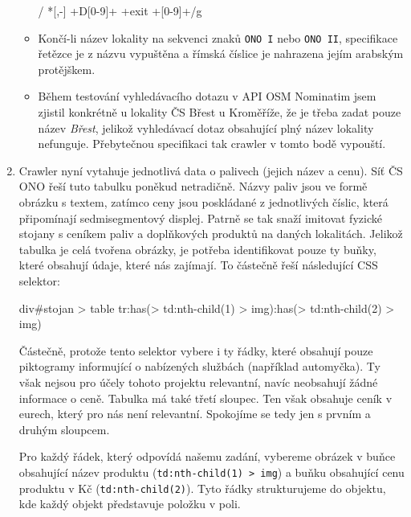 \begin{enumerate}
\begin{itemize}
                \begin{tt}
                    \centering
                    / *[,-] +D[0-9]+ +exit +[0-9]+/g
                \end{tt}
            \item Končí-li název lokality na sekvenci znaků \texttt{ONO I}
                nebo \texttt{ONO II}, specifikace řetězce je z názvu vypuštěna a římská
                číslice je nahrazena jejím arabským protějškem.
            \item Během testování vyhledávacího dotazu v API OSM Nominatim jsem zjistil
                konkrétně u lokality ČS Břest u Kroměříže, že je třeba zadat pouze název
                \emph{Břest}, jelikož vyhledávací dotaz obsahující plný název lokality
                nefunguje. Přebytečnou specifikaci tak crawler v tomto bodě vypouští.
        \end{itemize}
    \item Crawler nyní vytahuje jednotlivá data o palivech (jejich název a cenu).
        Síť ČS ONO řeší tuto tabulku poněkud netradičně. Názvy paliv jsou ve formě
        obrázku s textem, zatímco ceny jsou poskládané z jednotlivých číslic, která
        připomínají sedmisegmentový displej. Patrně se tak snaží imitovat fyzické stojany
        s ceníkem paliv a doplňkových produktů na daných lokalitách. Jelikož tabulka
        je celá tvořena obrázky, je potřeba identifikovat pouze ty buňky, které obsahují
        údaje, které nás zajímají. To částečně řeší následující CSS selektor:

        \begin{tt}
            \centering
            div\#stojan > table tr:has(> td:nth-child(1) > img):has(> td:nth-child(2) > img)
        \end{tt}

        Částečně, protože tento selektor vybere i ty řádky, které obsahují pouze piktogramy
        informující o nabízených službách (například automyčka). Ty však nejsou pro účely
        tohoto projektu relevantní, navíc neobsahují žádné informace o ceně.
        Tabulka má také třetí sloupec. Ten však obsahuje ceník v eurech, který pro nás
        není relevantní. Spokojíme se tedy jen s prvním a druhým sloupcem.

        Pro každý řádek, který odpovídá našemu zadání, vybereme obrázek v buňce
        obsahující název produktu (\texttt{td:nth-child(1) > img}) a buňku obsahující
        cenu produktu v Kč (\texttt{td:nth-child(2)}). Tyto řádky strukturujeme
        do objektu, kde každý objekt představuje položku v poli.


\end{enumerate}
